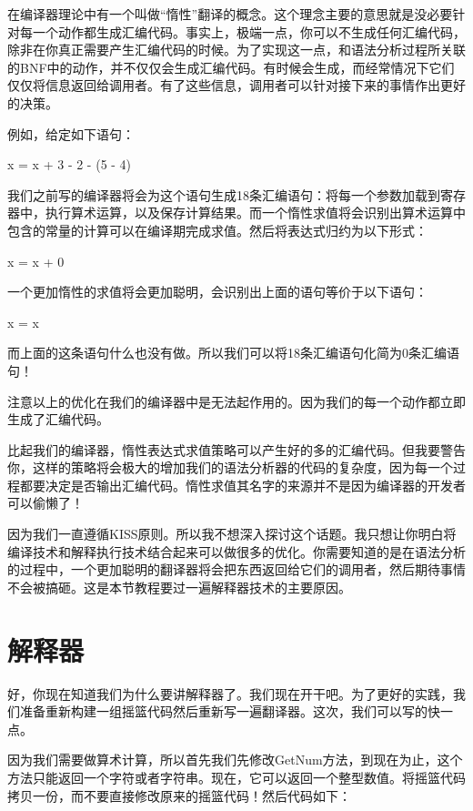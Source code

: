 在编译器理论中有一个叫做“惰性”翻译的概念。这个理念主要的意思就是没必要针对每一个动作都生成汇编代码。事实上，极端一点，你可以不生成任何汇编代码，除非在你真正需要产生汇编代码的时候。为了实现这一点，和语法分析过程所关联的BNF中的动作，并不仅仅会生成汇编代码。有时候会生成，而经常情况下它们仅仅将信息返回给调用者。有了这些信息，调用者可以针对接下来的事情作出更好的决策。

例如，给定如下语句：

\begin{tcolorbox}
x = x + 3 - 2 - (5 - 4)
\end{tcolorbox}

我们之前写的编译器将会为这个语句生成18条汇编语句：将每一个参数加载到寄存器中，执行算术运算，以及保存计算结果。而一个惰性求值将会识别出算术运算中包含的常量的计算可以在编译期完成求值。然后将表达式归约为以下形式：

\begin{tcolorbox}
x = x + 0
\end{tcolorbox}

一个更加惰性的求值将会更加聪明，会识别出上面的语句等价于以下语句：

\begin{tcolorbox}
x = x
\end{tcolorbox}

而上面的这条语句什么也没有做。所以我们可以将18条汇编语句化简为0条汇编语句！

注意以上的优化在我们的编译器中是无法起作用的。因为我们的每一个动作都立即生成了汇编代码。

比起我们的编译器，惰性表达式求值策略可以产生好的多的汇编代码。但我要警告你，这样的策略将会极大的增加我们的语法分析器的代码的复杂度，因为每一个过程都要决定是否输出汇编代码。惰性求值其名字的来源并不是因为编译器的开发者可以偷懒了！

因为我们一直遵循KISS原则。所以我不想深入探讨这个话题。我只想让你明白将编译技术和解释执行技术结合起来可以做很多的优化。你需要知道的是在语法分析的过程中，一个更加聪明的翻译器将会把东西返回给它们的调用者，然后期待事情不会被搞砸。这是本节教程要过一遍解释器技术的主要原因。

\section{解释器}

好，你现在知道我们为什么要讲解释器了。我们现在开干吧。为了更好的实践，我们准备重新构建一组摇篮代码然后重新写一遍翻译器。这次，我们可以写的快一点。

因为我们需要做算术计算，所以首先我们先修改GetNum方法，到现在为止，这个方法只能返回一个字符或者字符串。现在，它可以返回一个整型数值。将摇篮代码拷贝一份，而不要直接修改原来的摇篮代码！然后代码如下：

